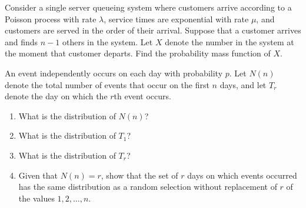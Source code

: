 \begin{exercise}
\label{ex:counting-processes-55}
Consider a single server queueing system where customers arrive according to a Poisson process with rate $\lambda$, service times are exponential with rate $\mu$, and customers are served in the order of their arrival. Suppose that a customer arrives and finds $n-1$ others in the system. Let $X$ denote the number in the system at the moment that customer departs. Find the probability mass function of $X$.
\end{exercise}


\begin{exercise}
\label{ex:counting-processes-56}
An event independently occurs on each day with probability $p$. Let $N(n)$ denote the total number of events that occur on the first $n$ days, and let $T_r$ denote the day on which the $r$th event occurs.
\begin{enumerate}
\item What is the distribution of $N(n)$?
\item What is the distribution of $T_1$?
\item What is the distribution of $T_r$?
\item Given that $N(n)=r$, show that the set of $r$ days on which events occurred has the same distribution as a random selection without replacement of $r$ of the values $1,2,\ldots,n$.
\end{enumerate}
\end{exercise}

